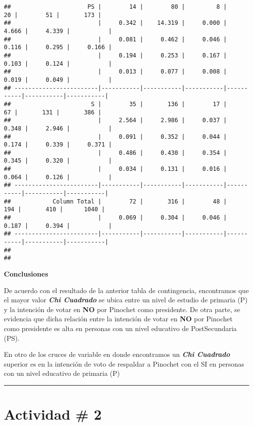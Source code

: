 \documentclass[
]{article}
\begin{document}
\begin{verbatim}
##                      PS |        14 |        80 |         8 |        20 |        51 |       173 | 
##                         |     0.342 |    14.319 |     0.000 |     4.666 |     4.339 |           | 
##                         |     0.081 |     0.462 |     0.046 |     0.116 |     0.295 |     0.166 | 
##                         |     0.194 |     0.253 |     0.167 |     0.103 |     0.124 |           | 
##                         |     0.013 |     0.077 |     0.008 |     0.019 |     0.049 |           | 
## ------------------------|-----------|-----------|-----------|-----------|-----------|-----------|
##                       S |        35 |       136 |        17 |        67 |       131 |       386 | 
##                         |     2.564 |     2.986 |     0.037 |     0.348 |     2.946 |           | 
##                         |     0.091 |     0.352 |     0.044 |     0.174 |     0.339 |     0.371 | 
##                         |     0.486 |     0.430 |     0.354 |     0.345 |     0.320 |           | 
##                         |     0.034 |     0.131 |     0.016 |     0.064 |     0.126 |           | 
## ------------------------|-----------|-----------|-----------|-----------|-----------|-----------|
##            Column Total |        72 |       316 |        48 |       194 |       410 |      1040 | 
##                         |     0.069 |     0.304 |     0.046 |     0.187 |     0.394 |           | 
## ------------------------|-----------|-----------|-----------|-----------|-----------|-----------|
## 
## 
\end{verbatim}

\textbf{Conclusiones}

De acuerdo con el resultado de la anterior tabla de contingencia,
encontramos que el mayor valor \textbf{\emph{Chi Cuadrado}} se ubica
entre un nivel de estudio de primaria (P) y la intención de votar en
\textbf{NO} por Pinochet como presidente. De otra parte, se evidencia
que dicha relación entre la intención de votar en \textbf{NO} por
Pinochet como presidente es alta en personas con un nivel educativo de
PostSecundaria (PS).

En otro de los cruces de variable en donde encontramos un
\textbf{\emph{Chi Cuadrado}} superior es en la intención de voto de
respaldar a Pinochet con el SI en personas con un nivel educativo de
primaria (P)

\begin{center}\rule{0.5\linewidth}{0.5pt}\end{center}

\hypertarget{actividad-2}{%
\section{Actividad \# 2}\label{actividad-2}}
\end{document}
